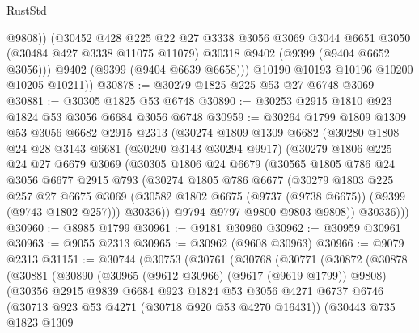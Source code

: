 \begin{lexlean}{RustStd}
\begin{coremodule}
              @9808))
          (@30452
            @428
            @225
            @22
            @27
            @3338
            @3056
            @3069
            @3044
            @6651
            @3050
            (@30484 @427 @3338 @11075 @11079)
            @30318
            @9402
            (@9399 (@9404 @6652 @3056)))
          @9402
          (@9399 (@9404 @6639 @6658)))
        @10190
        @10193
        @10196
        @10200
        @10205
        @10211))
@30878 := @30279 @1825 @225 @53 @27 @6748 @3069
@30881 := @30305 @1825 @53 @6748
@30890 := @30253 @2915 @1810 @923 @1824 @53 @3056 @6684 @3056 @6748
@30959 := @30264
    @1799
    @1809
    @1309
    @53
    @3056
    @6682
    @2915
    @2313
    (@30274
      @1809
      @1309
      @6682
      (@30280
        @1808
        @24
        @28
        @3143
        @6681
        (@30290 @3143 @30294 @9917)
        (@30279
          @1806
          @225
          @24
          @27
          @6679
          @3069
          (@30305
            @1806
            @24
            @6679
            (@30565
              @1805
              @786
              @24
              @3056
              @6677
              @2915
              @793
              (@30274
                @1805
                @786
                @6677
                (@30279
                  @1803
                  @225
                  @257
                  @27
                  @6675
                  @3069
                  (@30582 @1802 @6675 (@9737 (@9738 @6675)) (@9399 (@9743 @1802 @257)))
                  @30336))
              @9794
              @9797
              @9800
              @9803
              @9808))
          @30336)))
@30960 := @8985 @1799
@30961 := @9181 @30960
@30962 := @30959 @30961
@30963 := @9055 @2313
@30965 := @30962 (@9608 @30963)
@30966 := @9079 @2313
@31151 := @30744
    (@30753
      (@30761
        (@30768
          (@30771
            (@30872
              (@30878
                (@30881
                  (@30890
                    (@30965 (@9612 @30966) (@9617 (@9619 @1799)) @9808)
                    (@30356
                      @2915
                      @9839
                      @6684
                      @923
                      @1824
                      @53
                      @3056
                      @4271
                      @6737
                      @6746
                      (@30713 @923 @53 @4271 (@30718 @920 @53 @4270 @16431))
                      (@30443
                        @735
                        @1823
                        @1309

\end{coremodule}
\end{lexlean}
